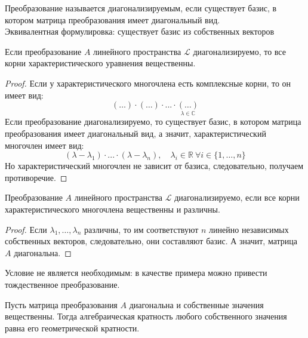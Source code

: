 \documentclass[11pt]{article}
\begin{document}
\begin{definition}
    Преобразование называется диагонализируемым, если существует базис, в котором 
    матрица преобразования имеет диагональный вид. \\ 
    Эквивалентная формулировка: существует базис из собственных векторов
\end{definition}

\begin{theorem}
    Если преобразование $A$ линейного пространства $\mathcal{L}$ диагонализируемо, 
    то все корни характеристического уравнения вещественны. 
\end{theorem}

\begin{proof}
    Если у характеристического многочлена есть комплексные корни, то он имеет вид:
    \[(\dots) \cdot (\dots) \cdot ... \cdot \underset{\lambda \in \mathbb{C}}{(\dots)}\]
    Если преобразование диагонализируемо, то существует базис, в котором матрица преобразования 
    имеет диагональный вид, а значит, характеристический многочлен имеет вид: 
    \[(\lambda - \lambda_1) \cdot ... \cdot (\lambda - \lambda_n), \quad \lambda_i \in  
    \mathbb{R} \ \forall i \in \{1, \dots, n\}\]
    Но характеристический многочлен не зависит от базиса, следовательно, получаем противоречие.
\end{proof}

\begin{theorem}
    Преобразование $A$ линейного пространства $\mathcal{L}$ диагонализируемо, если
    все корни характеристического многочлена вещественны и различны.
\end{theorem}

\begin{proof}
    Если $\lambda_1, \dots, \lambda_n$ различны, то им соответствуют $n$ линейно независимых
    собственных векторов, следовательно, они составляют базис. А значит, матрица 
    $A$ диагональна.
\end{proof}

\begin{remark}
    Условие не является необходимым: в качестве примера можно привести тождественное
    преобразование.
\end{remark}

\begin{consequence}
    Пусть матрица преобразования $A$ диагональна и собственные значения вещественны.
    Тогда алгебраическая кратность любого собственного значения равна его геометрической 
    кратности.
\end{consequence}
\end{document}
